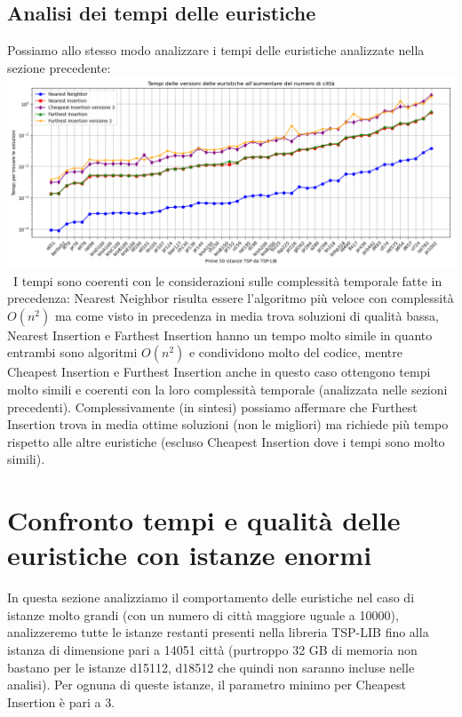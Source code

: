 \documentclass[a4paper,12pt]{report}
\begin{document}
\subsection{Analisi dei tempi delle euristiche}
Possiamo allo stesso modo analizzare i tempi delle euristiche analizzate nella sezione precedente: \newline
\includegraphics[width=1\textwidth]{../Grafici/8.png} \
I tempi sono coerenti con le considerazioni sulle complessità temporale fatte in precedenza: Nearest Neighbor risulta essere l'algoritmo più veloce con complessità $O(n^2)$ ma come visto in precedenza in media trova soluzioni di qualità bassa, Nearest Insertion e Farthest Insertion hanno un tempo molto simile in quanto entrambi sono algoritmi $O(n^2)$ e condividono molto del codice, mentre Cheapest Insertion e Furthest Insertion anche in questo caso ottengono tempi molto simili e coerenti con la loro complessità temporale (analizzata nelle sezioni precedenti). \newline Complessivamente (in sintesi) possiamo affermare che Furthest Insertion trova in media ottime soluzioni (non le migliori) ma richiede più tempo rispetto alle altre euristiche (escluso Cheapest Insertion dove i tempi sono molto simili).

\section{Confronto tempi e qualità delle euristiche con istanze enormi}
In questa sezione analizziamo il comportamento delle euristiche nel caso di istanze molto grandi (con un numero di città maggiore uguale a 10000), analizzeremo tutte le istanze restanti presenti nella libreria TSP-LIB fino alla istanza di dimensione pari a 14051 città (purtroppo 32 GB di memoria non bastano per le istanze d15112, d18512 che quindi non saranno incluse nelle analisi). Per ognuna di queste istanze, il parametro minimo per Cheapest Insertion è pari a 3. \newline
\end{document}
